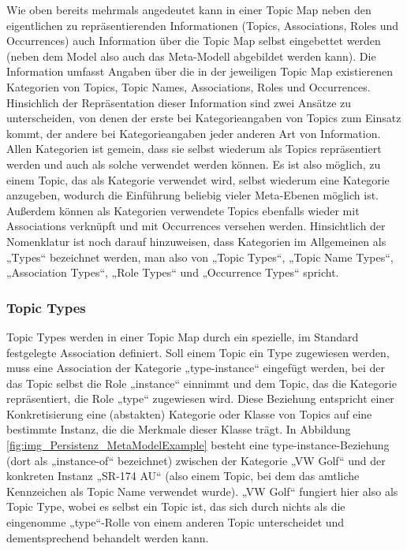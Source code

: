 Wie oben bereits mehrmals angedeutet kann in einer Topic Map neben den eigentlichen zu repräsentierenden Informationen (Topics, Associations, Roles und Occurrences) auch Information über die Topic Map selbst eingebettet werden (neben dem Model also auch das Meta-Modell abgebildet werden kann). Die Information umfasst Angaben über die in der jeweiligen Topic Map existierenen Kategorien von Topics, Topic Names, Associations, Roles und Occurrences. Hinsichlich der Repräsentation dieser Information sind zwei Ansätze zu unterscheiden, von denen der erste bei Kategorieangaben von Topics zum Einsatz kommt, der andere bei Kategorieangaben jeder anderen Art von Information. Allen Kategorien ist gemein, dass sie selbst wiederum als Topics repräsentiert werden und auch als solche verwendet werden können. Es ist also möglich, zu einem Topic, das als Kategorie verwendet wird, selbst wiederum eine Kategorie anzugeben, wodurch die Einführung beliebig vieler Meta-Ebenen möglich ist. Außerdem können als Kategorien verwendete Topics ebenfalls wieder mit Associations verknüpft und mit Occurrences versehen werden. Hinsichtlich der Nomenklatur ist noch darauf hinzuweisen, dass Kategorien im Allgemeinen als „Types“ bezeichnet werden, man also von „Topic Types“, „Topic Name Types“, „Association Types“, „Role Types“ und „Occurrence Types“ spricht.

\subsubsection{Topic Types}

Topic Types werden in einer Topic Map durch ein spezielle, im Standard festgelegte Association definiert. Soll einem Topic ein Type zugewiesen werden, muss eine Association der Kategorie „type-instance“ eingefügt werden, bei der das Topic selbst die Role „instance“ einnimmt und dem Topic, das die Kategorie repräsentiert, die Role „type“ zugewiesen wird. Diese Beziehung entspricht einer Konkretisierung eine (abstakten) Kategorie oder Klasse von Topics auf eine bestimmte Instanz, die die Merkmale dieser Klasse trägt. In Abbildung \ref{fig:img_Persistenz_MetaModelExample} besteht eine type-instance-Beziehung (dort als „instance-of“ bezeichnet) zwischen der Kategorie „VW Golf“ und der konkreten Instanz „SR-174 AU“ (also einem Topic, bei dem das amtliche Kennzeichen als Topic Name verwendet wurde). „VW Golf“ fungiert hier also als Topic Type, wobei es selbst ein Topic ist, das sich durch nichts als die eingenomme „type“-Rolle von einem anderen Topic unterscheidet und dementsprechend behandelt werden kann.

